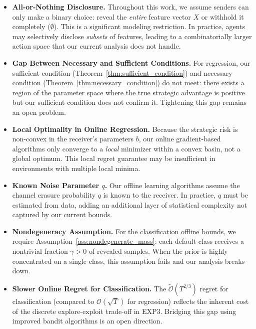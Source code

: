 \begin{itemize}
    \item \textbf{All-or-Nothing Disclosure.} Throughout this work, we assume senders can only make a binary choice: reveal the \emph{entire} feature vector $X$ or withhold it completely ($\emptyset$). This is a significant modeling restriction. In practice, agents may selectively disclose \emph{subsets} of features, leading to a combinatorially larger action space that our current analysis does not handle.
    
    \item \textbf{Gap Between Necessary and Sufficient Conditions.} For regression, our sufficient condition (Theorem~\ref{thm:sufficient_condition}) and necessary condition (Theorem~\ref{thm:necessary_condition}) do not meet: there exists a region of the parameter space where the true strategic advantage is positive but our sufficient condition does not confirm it. Tightening this gap remains an open problem.
    
    \item \textbf{Local Optimality in Online Regression.} Because the strategic risk is non-convex in the receiver's parameters $b$, our online gradient-based algorithms only converge to a \emph{local} minimizer within a convex basin, not a global optimum. This local regret guarantee may be insufficient in environments with multiple local minima.
    
    \item \textbf{Known Noise Parameter $q$.} Our offline learning algorithms assume the channel erasure probability $q$ is known to the receiver. In practice, $q$ must be estimated from data, adding an additional layer of statistical complexity not captured by our current bounds.
    
    \item \textbf{Nondegeneracy Assumption.} For the classification offline bounds, we require Assumption~\ref{ass:nondegenerate_mass}: each default class receives a nontrivial fraction $\gamma > 0$ of revealed samples. When the prior is highly concentrated on a single class, this assumption fails and our analysis breaks down.
    
    \item \textbf{Slower Online Regret for Classification.} The $\tilde{\mathcal{O}}(T^{2/3})$ regret for classification (compared to $\mathcal{O}(\sqrt{T})$ for regression) reflects the inherent cost of the discrete explore-exploit trade-off in EXP3. Bridging this gap using improved bandit algorithms is an open direction.
\end{itemize}

